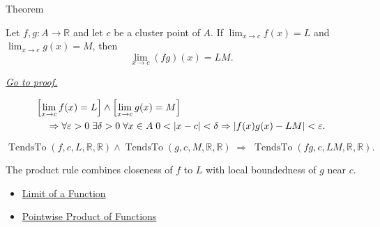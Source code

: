 
\begin{theorembox}{Theorem}
\begin{theorem}
\label{thm:limit-product}
Let $f,g:A\to\mathbb{R}$ and let $c$ be a cluster point of $A$. If
$\lim_{x\to c}f(x)=L$ and $\lim_{x\to c}g(x)=M$, then
\[
  \lim_{x\to c}(fg)(x)=LM.
\]

\smallskip\noindent
\hyperref[prf:limit-product]{\textit{Go to proof.}}
\end{theorem}
\end{theorembox}

\begin{remark*}
\[
\begin{aligned}
&\Bigl[\lim_{x\to c}f(x)=L\Bigr]\wedge\Bigl[\lim_{x\to c}g(x)=M\Bigr] \\
&\quad\Rightarrow
\forall\varepsilon>0\;\exists\delta>0\;\forall x\in A\;
0<|x-c|<\delta\Rightarrow |f(x)g(x)-LM|<\varepsilon.
\end{aligned}
\]
\end{remark*}

\begin{remark*}
\[
  \operatorname{TendsTo}(f,c,L,\mathbb{R},\mathbb{R})\wedge\operatorname{TendsTo}(g,c,M,\mathbb{R},\mathbb{R})
  \;\Longrightarrow\;
  \operatorname{TendsTo}(fg,c,LM,\mathbb{R},\mathbb{R}).
\]
\end{remark*}

\begin{remark*}[Interpretation]
The product rule combines closeness of $f$ to $L$ with local boundedness
of $g$ near $c$.
\end{remark*}

\begin{dependencies}
\begin{itemize}
  \item \hyperref[def:limit-function]{Limit of a Function}
  \item \hyperref[def:pointwise-product-of-functions]{Pointwise Product of Functions}
\end{itemize}
\end{dependencies}


